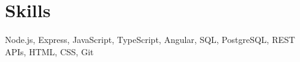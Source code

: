 \section*{Skills}
Node.js, Express, JavaScript, TypeScript, Angular, SQL, PostgreSQL, REST APIs, HTML, CSS, Git
